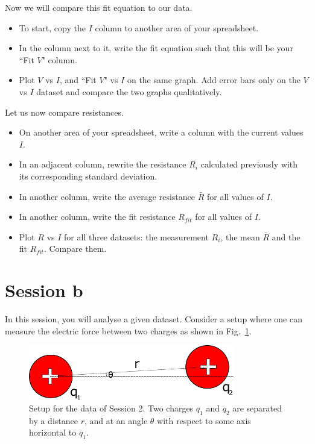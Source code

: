 \documentclass[12pt]{report}
\begin{document}
\noindent Now we will compare this fit equation to our data. 
\begin{itemize}
\item To start, copy the $I$ column to another area of your spreadsheet.
\item In the column next to it, write the fit equation such that this will be your ``Fit $V$" column.
\item Plot $V$ vs $I$, and ``Fit $V$" vs $I$ on the same graph. Add error bars only on the $V$ vs $I$ dataset and compare the two graphs qualitatively.
\end{itemize}

\noindent Let us now compare resistances.
\begin{itemize}
\item On another area of your spreadsheet, write a column with the current values $I$. 
\item In an adjacent column, rewrite the resistance $R_i$ calculated previously with its corresponding standard deviation.
\item In another column, write the average resistance $\bar{R}$ for all values of $I$.
\item In another column, write the fit resistance $R_{fit}$ for all values of $I$.
\item Plot $R$ vs $I$ for all three datasets: the measurement $R_i$, the mean $\bar{R}$ and the fit $R_{fit}$. Compare them.
\end{itemize}

\section{Session b}
In this session, you will analyse a given dataset. Consider a setup where one can measure the electric force between two charges as shown in Fig.~\ref{Fig:lab0-session2-setup}. 
\begin{figure}[h]
\centering
\includegraphics[width=0.8\textwidth]{lab0-session2}
\caption{Setup for the data of Session 2. Two charges $q_1$ and $q_2$ are separated by a distance $r$, and at an angle $\theta$ with respect to some axis horizontal to $q_1$.}
\label{Fig:lab0-session2-setup}
\end{figure}
\end{document}
